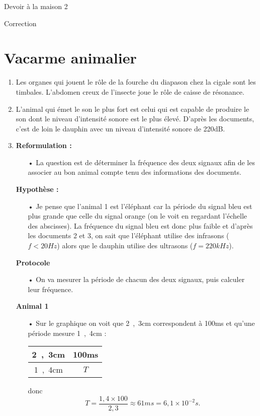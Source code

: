 \documentclass[12pt,a4paper,fleqn]{article}
\begin{document}
\begin{header}
Devoir à la maison 2

Correction
\end{header}

\section*{Vacarme animalier}

\begin{enumerate}
\item
Les organes qui jouent le rôle de la fourche du diapason chez la cigale sont les timbales.
L'abdomen creux de l'insecte joue le rôle de caisse de résonance.

\item
L'animal qui émet le son le plus fort est celui qui est capable de produire le son dont le niveau d'intensité sonore est le plus élevé.
D'après les documents, c'est de loin le dauphin avec un niveau d'intensité sonore de \unit{220}{dB}.

\item
\textbf{Reformulation :}
\begin{itemize}
\item[•] La question est de déterminer la fréquence des deux signaux afin de les associer au bon animal compte tenu des informations des documents.
\end{itemize}

\textbf{Hypothèse :}
\begin{itemize}
\item[•] Je pense que l'animal 1 est l'éléphant car la période du signal bleu est plus grande que celle du signal orange (on le voit en regardant l'échelle des abscisses).
La fréquence du signal bleu est donc plus faible et d'après les documents 2 et 3, on sait que l'éléphant utilise des infrasons ($f<\unit{20}{Hz}$) alors que le dauphin utilise des ultrasons ($f=\unit{220}{kHz}$).
\end{itemize}

\textbf{Protocole}
\begin{itemize}
\item[•] On va mesurer la période de chacun des deux signaux, puis calculer leur fréquence.
\end{itemize}
\begin{multicols}{2}
\begin{center}
\textbf{Animal 1}
\end{center}
\begin{itemize}
\item[•] Sur le graphique on voit que \unit{2{,}3}{cm} correspondent à \unit{100}{ms} et qu'une période \og mesure \fg{} \unit{1{,}4}{cm} :
\begin{center}
\begin{tabular}{c|c}
\unit{2{,}3}{cm} & \unit{100}{ms} \\
\hline
\unit{1{,}4}{cm} & $T$
\end{tabular}
\end{center}
donc 
\[ T = \frac{1{,}4 \times 100}{2{,}3} \approx \unit{61}{ms} = \unit{6{,}1\times10^{-2}}{s}. \]


\end{itemize}
\end{multicols}
\end{enumerate}
\end{document}
